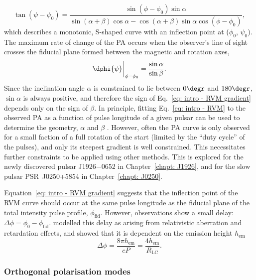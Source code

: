 \begin{equation}
    \label{eq: intro - RVM}
        \tan(\psi - \psi_0) = \frac{\sin(\phi-\phi_0)\sin\alpha}{\sin(\alpha+\beta)\cos\alpha-\cos(\alpha+\beta)\sin\alpha\cos(\phi-\phi_0)},
\end{equation}
which describes a monotonic, S-shaped curve with an inflection point at ($\phi_0$, $\psi_0$). The maximum rate of change of the PA occurs when the observer's line of sight crosses the fiducial plane formed between the magnetic and rotation axes,
\begin{equation}
    \label{eq: intro - RVM gradient}
    \dphi{\psi}\bigg|_{\phi=\phi_0} = \frac{\sin\alpha}{\sin\beta}.
\end{equation}
Since the inclination angle $\alpha$ is constrained to lie between $0\degr$ and $180\degr$, $\sin\alpha$ is always positive, and therefore the sign of Eq.~\eqref{eq: intro - RVM gradient} depends only on the sign of $\beta$. In principle, fitting Eq.~\eqref{eq: intro - RVM} to the observed PA as a function of pulse longitude of a given pulsar can be used to determine the geometry, $\alpha$ and $\beta$ \citep[e.g.][]{EWxx2001, JWxx2006,RWJx2015a}. However, often the PA curve is only observed for a small faction of a full rotation of the start (limited by the ``duty cycle'' of the pulses), and only its steepest gradient is well constrained. This necessitates further constraints to be applied using other methods. This is explored for the newly discovered pulsar J1926$-$0652 in Chapter~\ref{chapt: J1926}, and for the slow pulsar PSR~J0250+5854 in Chapter~\ref{chapt: J0250}.

Equation~\eqref{eq: intro - RVM gradient} suggests that the inflection point of the RVM curve should occur at the same pulse longitude as the fiducial plane of the total intensity pulse profile, $\phi_\mathrm{fid}$. However, observations show a small delay: $\Delta\phi = \phi_0 - \phi_\mathrm{fid}$. \citet{BCWx1991} modelled this delay as arising from relativistic aberration and retardation effects, and showed that it is dependent on the emission height $h_\mathrm{em}$
\begin{equation}
    \label{eq: intro - BCW shift}
    \Delta\phi = \frac{8\pi h_\mathrm{em}}{cP} = \frac{4h_\mathrm{em}}{R_\mathrm{LC}}.
\end{equation}

\subsubsection*{Orthogonal polarisation modes}
\label{sec: intro - emission models - polarisation - OPMs}

